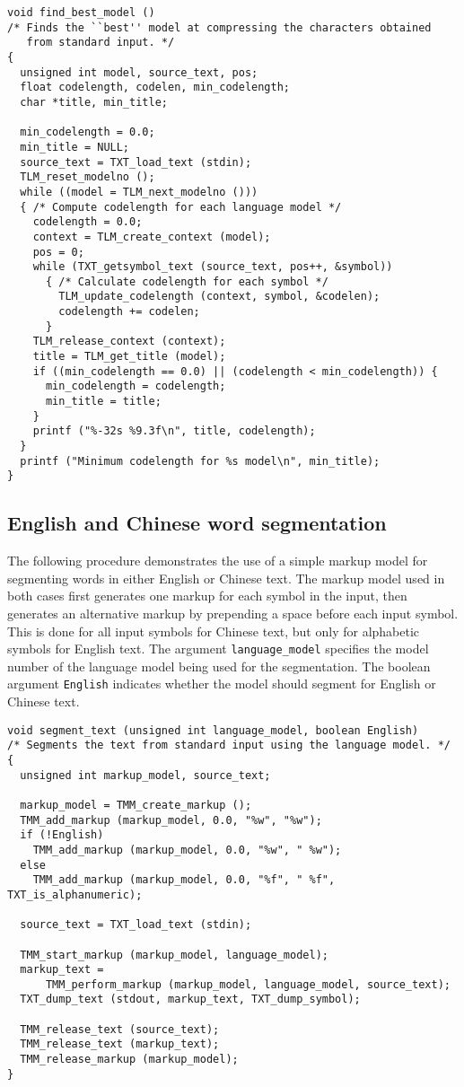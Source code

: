 \documentclass[11pt]{article}
\begin{document}
\begin{verbatim}
void find_best_model ()
/* Finds the ``best'' model at compressing the characters obtained
   from standard input. */
{
  unsigned int model, source_text, pos;
  float codelength, codelen, min_codelength;
  char *title, min_title;

  min_codelength = 0.0;
  min_title = NULL;
  source_text = TXT_load_text (stdin);
  TLM_reset_modelno ();
  while ((model = TLM_next_modelno ()))
  { /* Compute codelength for each language model */
    codelength = 0.0;
    context = TLM_create_context (model);
    pos = 0;
    while (TXT_getsymbol_text (source_text, pos++, &symbol))
      { /* Calculate codelength for each symbol */
        TLM_update_codelength (context, symbol, &codelen);
        codelength += codelen;
      }
    TLM_release_context (context);
    title = TLM_get_title (model);
    if ((min_codelength == 0.0) || (codelength < min_codelength)) {
      min_codelength = codelength;
      min_title = title;
    }
    printf ("%-32s %9.3f\n", title, codelength);
  }
  printf ("Minimum codelength for %s model\n", min_title);
}
\end{verbatim}

\subsection{English and Chinese word segmentation}

The following procedure demonstrates the use of a simple markup model for
segmenting words in either English or Chinese text. The markup model used
in both cases first generates one markup for each symbol in the input, then
generates an alternative markup by prepending a space before each input
symbol. This is done for all input symbols for Chinese text, but only for
alphabetic symbols for English text. The argument \verb|language_model|
specifies the model number of the language model being used for the
segmentation. The boolean argument \verb|English| indicates whether
the model should segment for English or Chinese text.

\begin{verbatim}
void segment_text (unsigned int language_model, boolean English)
/* Segments the text from standard input using the language model. */
{
  unsigned int markup_model, source_text;

  markup_model = TMM_create_markup ();
  TMM_add_markup (markup_model, 0.0, "%w", "%w");
  if (!English)
    TMM_add_markup (markup_model, 0.0, "%w", " %w");
  else
    TMM_add_markup (markup_model, 0.0, "%f", " %f", TXT_is_alphanumeric);

  source_text = TXT_load_text (stdin);

  TMM_start_markup (markup_model, language_model);
  markup_text =
      TMM_perform_markup (markup_model, language_model, source_text);
  TXT_dump_text (stdout, markup_text, TXT_dump_symbol);

  TMM_release_text (source_text);
  TMM_release_text (markup_text);
  TMM_release_markup (markup_model);
}
\end{verbatim}
\end{document}

